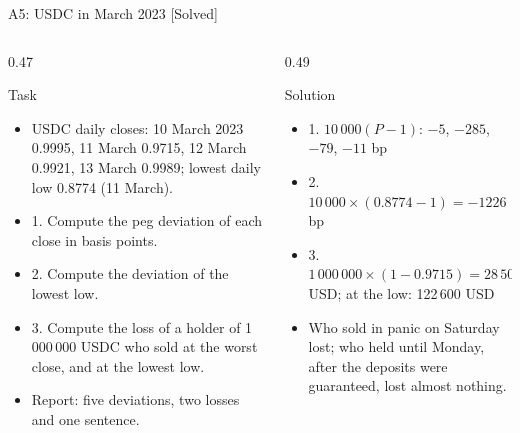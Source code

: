 \begin{frame}{A5: USDC in March 2023 [Solved]}
\itemsize{\scriptsize}
\begin{columns}[T]
\begin{column}{0.47\textwidth}
\begin{block}{Task}
\begin{itemize}
    \item USDC daily closes: 10 March 2023 0.9995, 11 March 0.9715, 12 March 0.9921, 13 March 0.9989; lowest daily low 0.8774 (11 March).
    \item 1. Compute the peg deviation of each close in basis points.
    \item 2. Compute the deviation of the lowest low.
    \item 3. Compute the loss of a holder of 1\,000\,000 USDC who sold at the worst close, and at the lowest low.
    \item Report: five deviations, two losses and one sentence.
\end{itemize}
\end{block}
\end{column}
\begin{column}{0.49\textwidth}
\begin{exampleblock}{Solution}
\begin{itemize}
    \item 1. $10\,000(P - 1)$: $-5$, $-285$, $-79$, $-11$ bp
    \item 2. $10\,000 \times (0.8774 - 1) = -1226$ bp
    \item 3. $1\,000\,000 \times (1 - 0.9715) = 28\,500$ USD; at the low: 122\,600 USD
    \item Who sold in panic on Saturday lost; who held until Monday, after the deposits were guaranteed, lost almost nothing.
\end{itemize}
\end{exampleblock}
\end{column}
\end{columns}
\end{frame}

